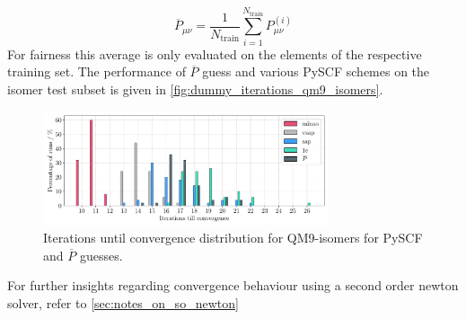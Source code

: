 \begin{equation}
    \label{eq:avg_guess}
    \overline{P}_{\mu\nu} = \frac{1}{N_\text{train}} \sum_{i=1}^{N_\text{train}} P^{(i)}_{\mu\nu}
\end{equation}
For fairness this average is only evaluated on the elements of the respective training set. The performance of $\overline{P}$ guess and various PySCF schemes on the  isomer test subset is given in \autoref{fig:dummy_iterations_qm9_isomers}. 
\begin{figure}[H]
    \centering
    \includegraphics[width=0.75\textwidth]{../fig/gnn/0_d_model_iteration_count_bar.pdf}
    \caption[Iterations until convergence distribution for QM9-isomers]{Iterations until convergence distribution for QM9-isomers for PySCF and $\overline{P}$ guesses.}
    \label{fig:dummy_iterations_qm9_isomers}
\end{figure}

For further insights regarding convergence behaviour using a second order newton solver, refer to \autoref{sec:notes_on_so_newton} 